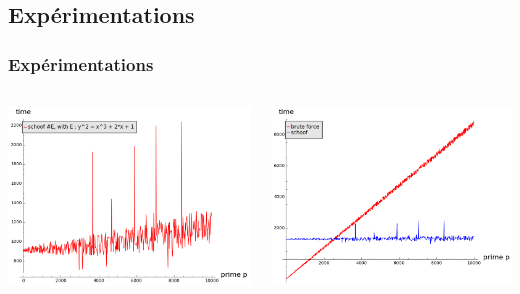 \documentclass[french]{beamer}
\begin{document}
\subsection{Expérimentations}
\begin{frame}
\frametitle{Expérimentations}
\begin{columns}[T]
	\begin{column}{5cm}
		\includegraphics[scale=0.4]{../pictures/schoof_cputime.png} 
	\end{column}
	\begin{column}{5cm}
		\includegraphics[scale=0.4]{../pictures/schoof_vs_bruteforce.png} 
	\end{column}
\end{columns}
\end{frame}
\end{document}
